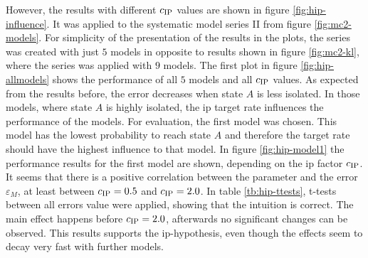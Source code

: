 However, the results with different $c_{\text{IP}}$ values are shown in figure \ref{fig:hip-influence}. It was applied to the systematic model series II from figure \ref{fig:mc2-models}. For simplicity of the presentation of the results in the plots, the series was created with just $5$ models in opposite to results shown in figure \ref{fig:mc2-kl}, where the series was applied with $9$ models. The first plot in figure \ref{fig:hip-allmodels} shows the performance of all $5$ models and all $c_{\text{IP}}$ values. As expected from the results before, the error decreases when state $A$ is less isolated. In those models, where state $A$ is highly isolated, the \acs{ip} target rate influences the performance of the models. For evaluation, the first model was chosen. This model has the lowest probability to reach state $A$ and therefore the target rate should have the highest influence to that model. In figure \ref{fig:hip-model1} the performance results for the first model are shown, depending on the \acs{ip} factor $c_{\text{IP}}$. It seems that there is a positive correlation between the parameter and the error $\varepsilon_M$, at least between $c_{\text{IP}} = 0.5$ and $c_{\text{IP}} = 2.0$. In table \ref{tb:hip-ttests}, t-tests between all errors value were applied, showing that the intuition is correct. The main effect happens before $c_{\text{IP}} = 2.0$, afterwards no significant changes can be observed. This results supports the \acs{ip}-hypothesis, even though the effects seem to decay very fast with further models.

